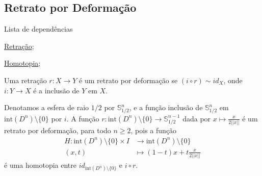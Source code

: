\subsection{Retrato por Deformação}
\label{retrato-por-deformação-def}
\begin{titlemize}{Lista de dependências}
	\item \hyperref[retração-def]{Retração};\\ %
	\item \hyperref[homotopia]{Homotopia};\\
\end{titlemize}
\begin{defi}
	Uma retração $r:X \rightarrow Y$ é um retrato por deformação se $(i\circ r) \sim id_X$, onde $i:Y \rightarrow X$ é a inclusão de $Y$ em $X$.
\end{defi}
    \begin{ex}
    Denotamos a esfera de raio $1/2$ por $\mathbb{S}^n_{1/2}$, e a função inclusão de $\mathbb{S}^n_{1/2}$ em $\text{int}(D^n)\setminus\{0\}$ por $i$. A função $r:\text{int}(D^n)\setminus\{0\}\longrightarrow \mathbb{S}^{n-1}_{1/2} $ dada por $x\longmapsto \frac{x}{2||x||}$ é um retrato por deformação, para todo $n\ge 2$, pois a função
    \begin{align*}
        H:\text{int}(D^n)\setminus\{0\} \times I &\longrightarrow \text{int}(D^n)\setminus\{0\}\\
        (x,t)&\longmapsto (1-t)x+t\frac{x}{2||x||}
    \end{align*}
    é uma homotopia entre $id_{\text{int}(D^n)\setminus\{0\}}$ e $i\circ r$.
\end{ex}
